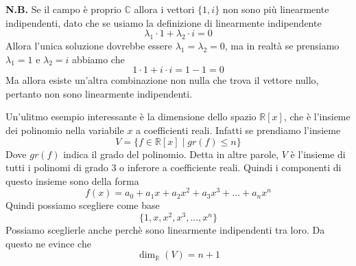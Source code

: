 \documentclass{rapport}
\begin{document}
    \textbf{N.B.} Se il campo è proprio $\mathbb{C}$ allora i vettori $\{1, i\}$ non sono più linearmente indipendenti, dato che se usiamo la definizione di linearmente indipendente
    \[
    \lambda_1 \cdot 1 + \lambda_2 \cdot i =0
    \]
    Allora l'unica soluzione dovrebbe essere $\lambda_1=\lambda_2=0$, ma in realtà se prensiamo $\lambda_1 = 1$ e $\lambda_2 = i$ abbiamo che 
    \[
    1\cdot 1 + i \cdot i = 1 -1 = 0 
    \]
    Ma allora esiste un'altra combinazione non nulla che trova il vettore nullo, pertanto non sono linearmente indipendenti. 

    Un'ulitmo esempio interessante è la dimensione dello spazio $\mathbb{R}[x]$, che è l'insieme dei polinomio nella variabile $x$ a coefficienti reali. Infatti se prendiamo l'insieme 
    \[
    V = \{f\in\mathbb{R}[x] \;|\; gr(f) \leq n\}
    \]
    Dove $gr(f)$ indica il grado del polinomio. Detta in altre parole, $V$ è l'insieme di tutti i polinomi di grado 3 o inferore a coefficiente reali. Quindi i componenti di questo insieme sono della forma 
    \[
    f(x)=a_0 + a_1 x + a_2x^2+ a_3x^3 + ... + a_nx^n
    \]
    Quindi possiamo scegliere come base 
    \[
    \{1,x,x^2,x^3,...,x^n\}
    \]
    Possiamo sceglierle anche perchè sono linearmente indipendenti tra loro. Da questo ne evince che
    \[
    \dim_{\mathbb{R}} (V) = n+1
    \]
    
\end{document}
